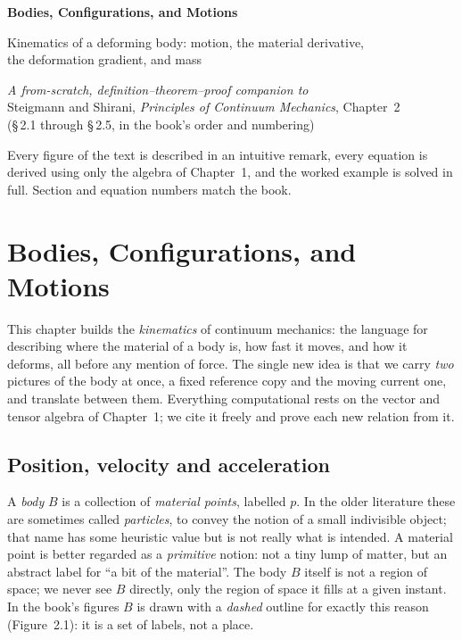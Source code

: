\documentclass[17pt,a4paper]{extreport}
\theoremstyle{scplain}
\theoremstyle{scdefn}
\begin{document}
\begin{titlepage}
\centering
\vspace*{3cm}
{\Large\bfseries Bodies, Configurations, and Motions\par}
\vspace{4mm}
{\large Kinematics of a deforming body: motion, the material derivative,\\
the deformation gradient, and mass\par}
\vspace{8mm}
{\itshape A from-scratch, definition--theorem--proof companion to}\\[2mm]
{Steigmann and Shirani, \emph{Principles of Continuum Mechanics},
Chapter~2}\\[1mm]
{(\S\,2.1 through \S\,2.5, in the book's order and numbering)}
\vfill
{\small Every figure of the text is described in an intuitive remark, every
equation is derived using only the algebra of Chapter~1, and the worked
example is solved in full. Section and equation numbers match the book.\par}
\vspace{1cm}
\end{titlepage}

\tableofcontents

\chapter{Bodies, Configurations, and Motions}

This chapter builds the \emph{kinematics} of continuum mechanics: the
language for describing where the material of a body is, how fast it moves,
and how it deforms, all before any mention of force. The single new idea is
that we carry \emph{two} pictures of the body at once, a fixed reference
copy and the moving current one, and translate between them. Everything
computational rests on the vector and tensor algebra of Chapter~1; we cite
it freely and prove each new relation from it.

\section{Position, velocity and acceleration}\label{sec:pva}

A \emph{body} $B$ is a collection of \emph{material points}, labelled $p$.
In the older literature these are sometimes called \emph{particles}, to
convey the notion of a small indivisible object; that name has some
heuristic value but is not really what is intended. A material point is
better regarded as a \emph{primitive} notion: not a tiny lump of matter, but
an abstract label for ``a bit of the material''. The body $B$ itself is not a
region of space; we never see $B$ directly, only the region of space it
fills at a given instant. In the book's figures $B$ is drawn with a
\emph{dashed} outline for exactly this reason (Figure~2.1): it is a set of
labels, not a place.
\end{document}
